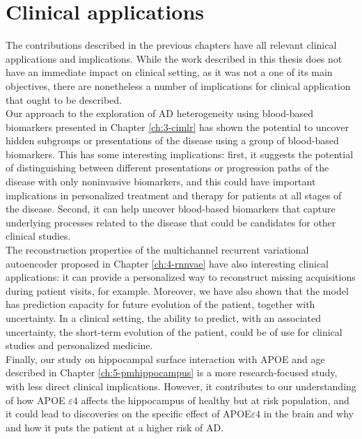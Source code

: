 \section{Clinical applications}
The contributions described in the previous chapters have all relevant clinical applications and implications. While the work described in this thesis does not have an immediate impact on clinical setting, as it was not a one of its main objectives, there are nonetheless a number of implications for clinical application that ought to be described. \\

Our approach to the exploration of AD heterogeneity using blood-based biomarkers presented in Chapter \ref{ch:3-cimlr} has shown the potential to uncover hidden subgroups or presentations of the disease using a group of blood-based biomarkers. This has some interesting implications: first, it suggests the potential of distinguishing between different presentations or progression paths of the disease with only noninvasive biomarkers, and this could have important implications in personalized treatment and therapy for patients at all stages of the disease. Second, it can help uncover blood-based biomarkers that capture underlying processes related to the disease that could be candidates for other clinical studies. \\

The reconstruction properties of the multichannel recurrent variational autoencoder proposed in Chapter \ref{ch:4-rnnvae} have also interesting clinical applications: it can provide a personalized way to reconstruct missing acquisitions during patient visits, for example. Moreover, we have also shown that the model has  prediction capacity for future evolution of the patient, together with uncertainty. In a clinical setting, the ability to predict, with an associated uncertainty, the short-term evolution of the patient, could be of use for clinical studies and personalized medicine. \\

Finally, our study on hippocampal surface interaction with APOE and age described in Chapter \ref{ch:5-pmhippocampus} is a more research-focused study, with less direct clinical implications. However, it contributes to our understanding of how APOE $\varepsilon4$ affects the hippocampus of healthy but at risk population, and it could lead to discoveries on the specific effect of APOE$\varepsilon4$ in the brain and why and how it puts the patient at a higher risk of AD.

